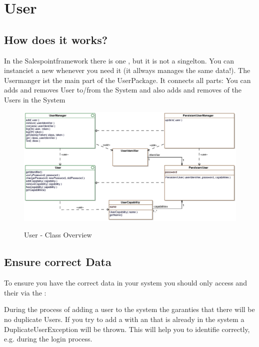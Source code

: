 \newpage
\section{User}

\subsection{How does it works?}

In the Salespointframework there is one , but it is not a singelton. You can instanciet a new
 whenever you need it (it allways manages the same data!).
The Usermanger ist the main part of the UserPackage. It connects all parts:
You can adds and removes User to/from the System and also adds and removes  of the Users in the System

\begin{figure}[ht]
	\centering
  \includegraphics[width=1.0\textwidth]{images/User_Overview.eps}
	\label{user_overview}
	\caption{User - Class Overview}
\end{figure}

\subsection{Ensure correct Data}
To ensure you have the correct data in your system you should only access  and their  via the :

During the process of adding a user to the system the  garanties that there will be no duplicate Users. If you try to add a  with an  that is already in the system a DuplicateUserException will be thrown. This will help you to identifie  correctly, e.g. during the login process.

